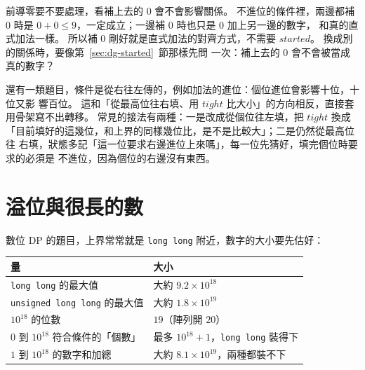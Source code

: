 前導零要不要處理，看補上去的 $0$ 會不會影響關係。 不進位的條件裡，兩邊都補
$0$ 時是 $0 + 0 \le 9$，一定成立；一邊補 $0$ 時也只是 $0$ 加上另一邊的數字，
和真的直式加法一樣。 所以補 $0$ 剛好就是直式加法的對齊方式，不需要
$\mathit{started}$。 換成別的關係時，要像第~\ref{sec:dg-started}~節那樣先問
一次：補上去的 $0$ 會不會被當成真的數字？

還有一類題目，條件是從右往左傳的，例如加法的進位：個位進位會影響十位，十位又影
響百位。 這和「從最高位往右填、用 $\mathit{tight}$ 比大小」的方向相反，直接套
用骨架寫不出轉移。 常見的接法有兩種：一是改成從個位往左填，把 $\mathit{tight}$
換成「目前填好的這幾位，和上界的同樣幾位比，是不是比較大」；二是仍然從最高位往
右填，狀態多記「這一位要求右邊進位上來嗎」，每一位先猜好，填完個位時要求的必須是
不進位，因為個位的右邊沒有東西。

\section{溢位與很長的數}
\label{sec:dg-overflow}

數位 DP 的題目，上界常常就是 \texttt{long long} 附近，數字的大小要先估好：

\begin{center}
\begin{tabular}{ll}
\toprule
量 & 大小 \\
\midrule
\texttt{long long} 的最大值 & 大約 $9.2 \times 10^{18}$ \\
\texttt{unsigned long long} 的最大值 & 大約 $1.8 \times 10^{19}$ \\
$10^{18}$ 的位數 & $19$（陣列開 $20$） \\
$0$ 到 $10^{18}$ 符合條件的「個數」 & 最多 $10^{18} + 1$，\texttt{long long} 裝得下 \\
$1$ 到 $10^{18}$ 的數字和加總 & 大約 $8.1 \times 10^{19}$，兩種都裝不下 \\
\bottomrule
\end{tabular}
\end{center}

